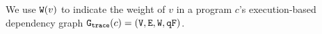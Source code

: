 We use $\mathtt{W}(v)$ to indicate the weight of $v$ in a program $c$'s execution-based dependency graph $\mathtt{{G_{trace}}}({c}) = (\mathtt{V}, \mathtt{E}, \mathtt{W}, \mathtt{qF})$.
%

